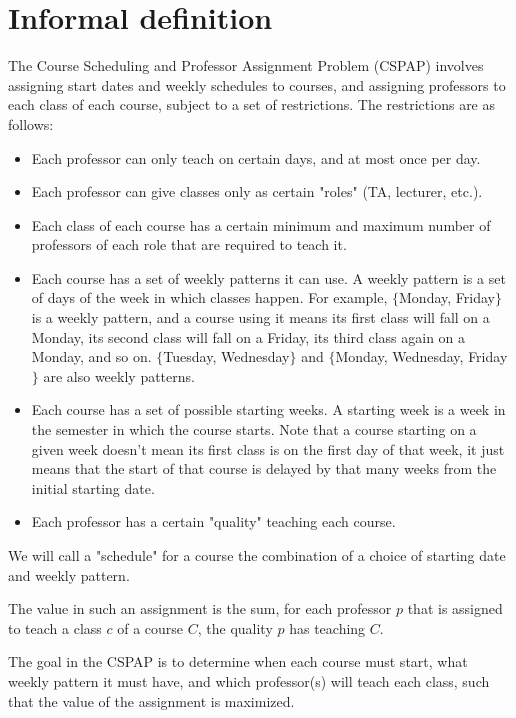 \section{Informal definition}

The Course Scheduling and Professor Assignment Problem (CSPAP) involves assigning start dates and weekly schedules to courses, and assigning professors to each class of each course, subject to a set of restrictions. The restrictions are as follows:

\begin{itemize}
\item Each professor can only teach on certain days, and at most once per day.
\item Each professor can give classes only as certain "roles" (TA, lecturer, etc.).
\item Each class of each course has a certain minimum and maximum number of professors of each role that are required to teach it.
\item Each course has a set of weekly patterns it can use. A weekly pattern is a set of days of the week in which classes happen. For example, $\{$Monday, Friday$\}$ is a weekly pattern, and a course using it means its first class will fall on a Monday, its second class will fall on a Friday, its third class again on a Monday, and so on. $\{$Tuesday, Wednesday$\}$ and $\{$Monday, Wednesday, Friday$\}$ are also weekly patterns.
\item Each course has a set of possible starting weeks. A starting week is a week in the semester in which the course starts. Note that a course starting on a given week doesn't mean its first class is on the first day of that week, it just means that the start of that course is delayed by that many weeks from the initial starting date.
\item Each professor has a certain "quality" teaching each course.
\end{itemize}

We will call a "schedule" for a course the combination of a choice of starting date and weekly pattern.

The value in such an assignment is the sum, for each professor $p$ that is assigned to teach a class $c$ of a course $C$, the quality $p$ has teaching $C$.

The goal in the CSPAP is to determine when each course must start, what weekly pattern it must have, and which professor(s) will teach each class, such that the value of the assignment is maximized.

